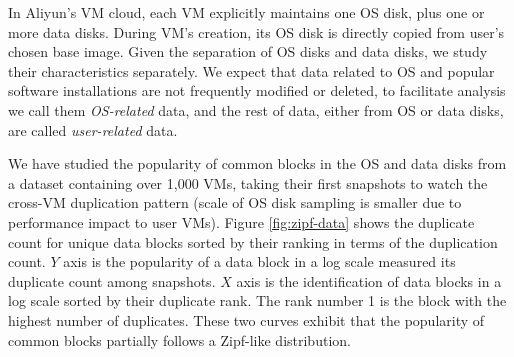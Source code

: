 In Aliyun's VM cloud, each VM explicitly maintains  one OS disk, plus one or more data disks.
During VM's creation, its OS disk is directly copied from user's chosen base image.
Given the separation of OS disks and data disks, we study  their characteristics separately.
We expect that data related to OS and popular software installations are not frequently
modified or deleted, to facilitate analysis we call them \emph{OS-related} data, 
and the rest of data, either from OS or data disks, are called \emph{user-related} data.

We have studied the popularity of common blocks in the OS and data disks from a dataset
containing over 1,000 VMs, taking their first snapshots to watch the cross-VM duplication pattern 
(scale of OS disk sampling is smaller due to performance impact to user VMs).
Figure \ref{fig:zipf-data} shows the duplicate count for unique data blocks sorted by their ranking in 
terms of the duplication count. $Y$ axis is the popularity of a data block in a log scale 
measured its duplicate count among snapshots. $X$ axis is the identification of data blocks in a log scale
sorted by their duplicate rank.  The rank number 1 is the block with the highest number of duplicates.
These two curves exhibit that the popularity of common blocks partially follows a Zipf-like distribution.








